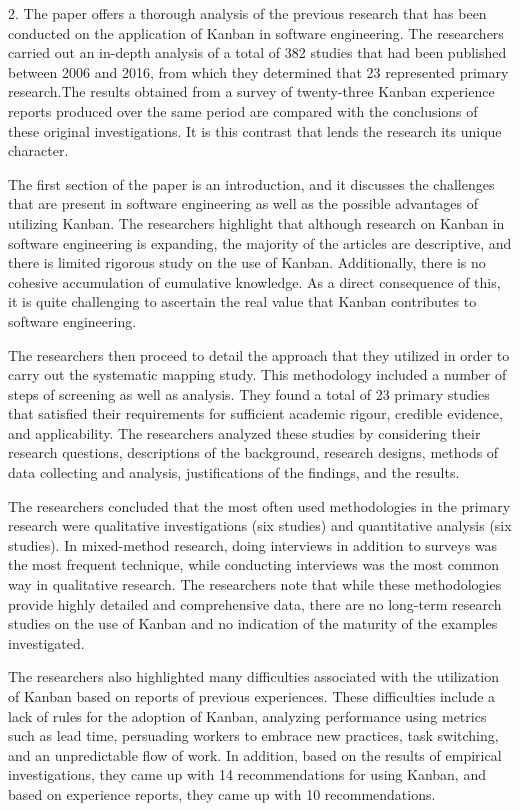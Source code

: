 \documentclass[conference]{IEEEtran}
\begin{document}
2. The paper \cite{kanban2}  offers a thorough analysis of the previous research that has been conducted on the application of Kanban in software engineering. The researchers carried out an in-depth analysis of a total of 382 studies that had been published between 2006 and 2016, from which they determined that 23 represented primary research.The results obtained from a survey of twenty-three Kanban experience reports produced over the same period are compared with the conclusions of these original investigations. It is this contrast that lends the research its unique character.

\newline
The first section of the paper is an introduction, and it discusses the challenges that are present in software engineering as well as the possible advantages of utilizing Kanban. The researchers highlight that although research on Kanban in software engineering is expanding, the majority of the articles are descriptive, and there is limited rigorous study on the use of Kanban. Additionally, there is no cohesive accumulation of cumulative knowledge. As a direct consequence of this, it is quite challenging to ascertain the real value that Kanban contributes to software engineering.

The researchers then proceed to detail the approach that they utilized in order to carry out the systematic mapping study. This methodology included a number of steps of screening as well as analysis. They found a total of 23 primary studies that satisfied their requirements for sufficient academic rigour, credible evidence, and applicability. The researchers analyzed these studies by considering their research questions, descriptions of the background, research designs, methods of data collecting and analysis, justifications of the findings, and the results.

The researchers concluded that the most often used methodologies in the primary research were qualitative investigations (six studies) and quantitative analysis (six studies). In mixed-method research, doing interviews in addition to surveys was the most frequent technique, while conducting interviews was the most common way in qualitative research. The researchers note that while these methodologies provide highly detailed and comprehensive data, there are no long-term research studies on the use of Kanban and no indication of the maturity of the examples investigated.


The researchers also highlighted many difficulties associated with the utilization of Kanban based on reports of previous experiences. These difficulties include a lack of rules for the adoption of Kanban, analyzing performance using metrics such as lead time, persuading workers to embrace new practices, task switching, and an unpredictable flow of work. In addition, based on the results of empirical investigations, they came up with 14 recommendations for using Kanban, and based on experience reports, they came up with 10 recommendations.
\end{document}
